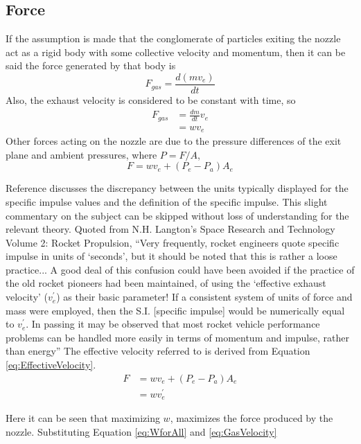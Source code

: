 \subsection{Force}\label{subsec:Force}
If the assumption is made that the conglomerate of particles exiting the nozzle act as a rigid body with some collective velocity and momentum, then it can be said the force generated by that body is
\begin{equation}
F_{gas}=\frac{d(mv_e)}{dt}
\end{equation}
Also, the exhaust velocity is considered to be constant with time, so
\begin{align}
F_{gas}&=\frac{dm}{dt}v_e\\
&=wv_e
\end{align}
Other forces acting on the nozzle are due to the pressure differences of the exit plane and ambient pressures, where $P=F/A$,
\begin{equation}\label{eq:EffectiveVelocity}
F=wv_e + (P_e-P_a)A_e
\end{equation}
\begin{tcolorbox}[breakable,title=Unit Discrepancy, height fixed for=first and middle]
Reference \cite{langton} discusses the discrepancy between the units typically displayed for the specific impulse values and the definition of the specific impulse. This slight commentary on the subject can be skipped without loss of understanding for the relevant theory. Quoted from N.H. Langton's Space Research and Technology Volume 2: Rocket Propulsion, ``Very frequently, rocket engineers quote specific impulse in units of `seconds', but it should be noted that this is rather a loose practice... A good deal of this confusion could have been avoided if the practice of the old rocket pioneers had been maintained, of using the `effective exhaust velocity' ($v_e^{'}$) as their basic parameter! If a consistent system of units of force and mass were employed, then the S.I. [specific impulse] would be numerically equal to $v_e^{'}$. In passing it may be observed that most rocket vehicle performance problems can be handled more easily in terms of momentum and impulse, rather than energy'' The effective velocity referred to is derived from Equation \ref{eq:EffectiveVelocity}.
\begin{align*}
F&=wv_e + (P_e-P_a)A_e\\
&=wv_e^{'}
\end{align*}
\end{tcolorbox}
Here it can be seen that maximizing $w$, maximizes the force produced by the nozzle. Substituting Equation \ref{eq:WforAll} and \ref{eq:GasVelocity}
